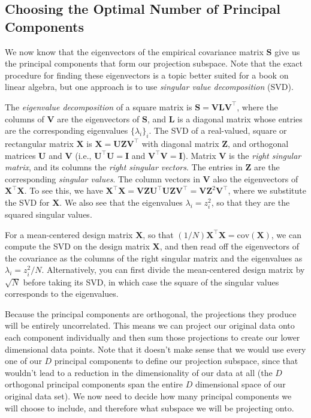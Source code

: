 \subsection{Choosing the Optimal Number of Principal Components}
We now know that the eigenvectors of the empirical covariance matrix $\textbf{S}$ give us the principal components that form our projection subspace. Note that the exact procedure for finding these eigenvectors is a topic better suited for a book on linear algebra, but one approach is to use
{\em singular value decomposition } (SVD).

The {\em eigenvalue decomposition} of a square matrix is $\mathbf{S}=\mathbf{VLV}^\top$, where the columns of $\mathbf{V}$ are the eigenvectors of $\mathbf{S}$, and $\mathbf{L}$ is a diagonal matrix whose entries are the corresponding eigenvalues $\{\lambda_i\}_i$.
%
%
The SVD of a real-valued, square or rectangular matrix $\mathbf{X}$ is $\mathbf{X}=\mathbf{U}\mathbf{Z}\mathbf{V}^\top$ with diagonal matrix $\mathbf{Z}$, and orthogonal matrices $\mathbf{U}$ and $\mathbf{V}$ (i.e., $\mathbf{U}^\top\mathbf{U}=\mathbf{I}$ and $\mathbf{V}^\top\mathbf{V}=\mathbf{I}$). Matrix $\mathbf{V}$ is the {\em  right singular matrix}, and its columns the {\em right singular vectors}. The entries in $\mathbf{Z}$ are the corresponding
{\em singular values}. The column vectors in $\mathbf{V}$ also the eigenvectors of $\mathbf{X}^\top\mathbf{X}$. To see this, we have $\mathbf{X}^\top\mathbf{X}=\mathbf{VZU}^\top\mathbf{UZV}^\top=\mathbf{VZ}^2\mathbf{V}^\top$, where we substitute the SVD for $\mathbf{X}$. We also see that the eigenvalues $\lambda_i=z_i^2$, so that they are the squared singular values.
%

For a mean-centered design matrix $\mathbf{X}$, so that $(1/N)\mathbf{X}^\top\mathbf{X}=\mathrm{cov}(\mathbf{X})$, we can compute the SVD on the design matrix $\mathbf{X}$, and then read off the eigenvectors of the covariance as the columns of the right singular matrix and the eigenvalues as $\lambda_i=z_i^2/N$. Alternatively, you can first divide the mean-centered design matrix by $\sqrt{N}$ before taking its SVD, in which case the square of the singular values corresponds to the eigenvalues.

Because the principal components are orthogonal, the projections they produce will be entirely uncorrelated. This means we can project our original data onto each component individually and then sum those projections to create our lower dimensional data points. Note that it doesn't make sense that we would use every one of our $D$ principal components to define our projection subspace, since that wouldn't lead to a reduction in the dimensionality of our data at all (the $D$ orthogonal principal components span the entire $D$ dimensional space of our original data set). We now need to decide how many principal components we will choose to include, and therefore what subspace we will be projecting onto.

